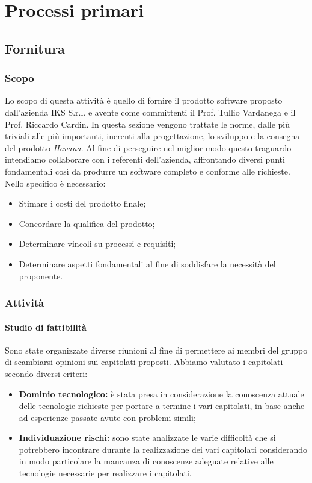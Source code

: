 \section{Processi primari}

\subsection{Fornitura}
	
	\subsubsection{Scopo}
	Lo scopo di questa attività è quello di fornire il prodotto software proposto dall'azienda IKS S.r.l. e avente come committenti il Prof. Tullio Vardanega e il Prof. Riccardo Cardin.
	In questa sezione vengono trattate le norme, dalle più triviali alle più importanti, inerenti alla progettazione, lo sviluppo e la consegna del prodotto \emph{Havana}.
	Al fine di perseguire nel miglior modo questo traguardo intendiamo collaborare con i referenti dell'azienda, affrontando diversi punti fondamentali così da produrre un software completo e conforme alle richieste. Nello specifico è necessario:
    \begin{itemize}
	\item Stimare i costi del prodotto finale;
	\item Concordare la qualifica del prodotto;
	\item Determinare vincoli su processi e requisiti;
	\item Determinare aspetti fondamentali al fine di soddisfare la necessità del proponente.
	\end{itemize}
	\subsubsection{Attività} 
		\paragraph{Studio di fattibilità} \Spazio
		Sono state organizzate diverse riunioni al fine di permettere ai membri del gruppo di scambiarsi opinioni sui capitolati proposti. 
		Abbiamo valutato i capitolati secondo diversi criteri:
		\begin{itemize}
			\item \textbf{Dominio tecnologico:} è stata presa in considerazione la conoscenza attuale delle tecnologie richieste per portare a termine i vari capitolati, in base anche ad esperienze passate avute con problemi simili;
			\item \textbf{Individuazione rischi:} sono state analizzate le varie difficoltà che si potrebbero incontrare durante la realizzazione dei vari capitolati considerando in modo particolare la mancanza di conoscenze adeguate relative alle tecnologie necessarie per realizzare i capitolati.
		\end{itemize}  \textit{}
